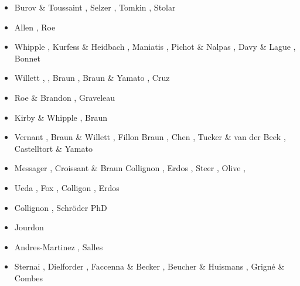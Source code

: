 \begin{scriptsize}
\begin{itemize}
\item [\twothousandseven] Burov \& Toussaint \cite{buto07}, Selzer \etal \cite{sebp07},
                          Tomkin \cite{tomk07}, Stolar \etal \cite{strw07}
\item [\twothousandeight] Allen \cite{alle08}, Roe \etal \cite{rowf08}
\item [\twothousandnine]  Whipple \cite{whip09}, Kurfess \& Heidbach \cite{kuhe09},
                          Maniatis \etal \cite{makh09}, Pichot \& Nalpas \cite{pina09},
                          Davy \& Lague \cite{dala09}, Bonnet \cite{bonn09}
\item [\twothousandten] Willett \cite{will10}, \cite{tuha10},
                        Braun \cite{brau10}, Braun \& Yamato \cite{brya10},
                        Cruz \etal \cite{crmw10}
\item [\twothousandeleven] Roe \& Brandon \cite{robr11}, Graveleau \etal \cite{grhd11}
\item [\twothousandtwelve]  Kirby \& Whipple \cite{kiwh12}, Braun \etal \cite{brvv12}
\item [\twothousandthirteen] Vernant \etal \cite{vehc13}, Braun \& Willett \cite{brwi13},
                             Fillon \etal \cite{fihv13a,fihv13b}
                             Braun \etal \cite{brrs13}, Chen \etal \cite{chgz13},
                             Tucker \& van der Beek \cite{tuva13}, Castelltort \& Yamato \cite{caya13} 
\item [\twothousandfourteen] Messager \etal \cite{mehn14}, Croissant \& Braun \cite{crbr14}
                             Collignon \etal \cite{cokm14}, Erdos \etal \cite{erhv14},
                             Steer \etal \cite{stsc14}, Olive \etal \cite{olbm14}, 
\item [\twothousandfifteen]  Ueda \etal \cite{uewg15}, Fox \etal \cite{fohk15},
                             Colligon \etal \cite{cofk15}, Erdos \etal \cite{erhv15}
\item [\twothousandsixteen]  Collignon \etal \cite{coyc16}, Schr{\"o}der PhD \cite{schr16}
\item [\twothousandeighteen] Jourdon \etal \cite{jolp18}
\item [\twothousandnineteen] Andres-Martinez \etal \cite{anpa19}, Salles \cite{sall19}
\item [\twothousandtwenty]  Sternai \cite{ster20}, Dielforder \etal \cite{diho20}, 
                            Faccenna \& Becker \cite{fabe20}, Beucher \& Huismans \cite{behu20}, 
                            Grign\'e \& Combes \cite{grco20}
\end{itemize}
\end{scriptsize}

